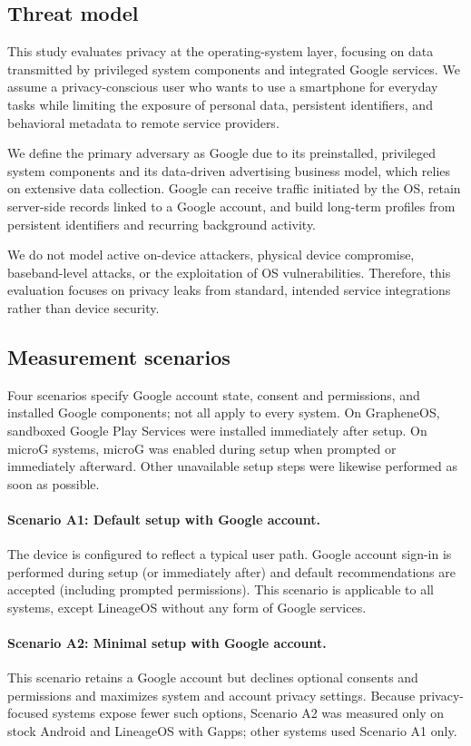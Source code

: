 \subsection{Threat model}

This study evaluates privacy at the operating-system layer, focusing on data transmitted by privileged system components and integrated Google services. We assume a privacy-conscious user who wants to use a smartphone for everyday tasks while limiting the exposure of personal data, persistent identifiers, and behavioral metadata to remote service providers.

We define the primary adversary as Google due to its preinstalled, privileged system components and its data-driven advertising business model, which relies on extensive data collection. Google can receive traffic initiated by the OS, retain server-side records linked to a Google account, and build long-term profiles from persistent identifiers and recurring background activity.

We do not model active on-device attackers, physical device compromise, baseband-level attacks, or the exploitation of OS vulnerabilities. Therefore, this evaluation focuses on privacy leaks from standard, intended service integrations rather than device security.

\subsection{Measurement scenarios}
Four scenarios specify Google account state, consent and permissions, and installed Google components; not all apply to every system. On GrapheneOS, sandboxed Google Play Services were installed immediately after setup. On microG systems, microG was enabled during setup when prompted or immediately afterward. Other unavailable setup steps were likewise performed as soon as possible.

\paragraph{Scenario A1: Default setup with Google account.}
The device is configured to reflect a typical user path. Google account sign-in is performed during setup (or immediately after) and default recommendations are accepted (including prompted permissions). This scenario is applicable to all systems, except LineageOS without any form of Google services.

\paragraph{Scenario A2: Minimal setup with Google account.}
This scenario retains a Google account but declines optional consents and permissions and maximizes system and account privacy settings. Because privacy-focused systems expose fewer such options, Scenario A2 was measured only on stock Android and LineageOS with Gapps; other systems used Scenario A1 only.

